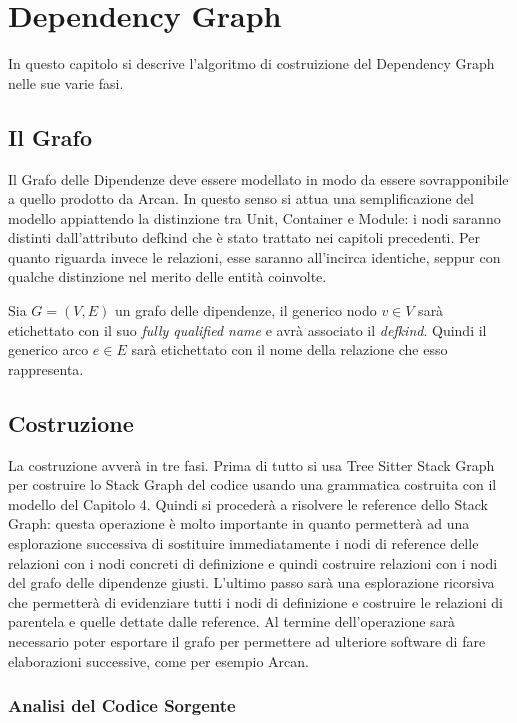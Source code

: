 \chapter{Dependency Graph}

In questo capitolo si descrive l'algoritmo di costruizione del Dependency Graph nelle sue varie fasi.

\section{Il Grafo}

Il Grafo delle Dipendenze deve essere modellato in modo da essere sovrapponibile a quello prodotto da Arcan.
In questo senso si attua una semplificazione del modello appiattendo la distinzione tra Unit, Container e Module: i nodi saranno distinti dall'attributo defkind che \`e stato trattato nei capitoli precedenti.
Per quanto riguarda invece le relazioni, esse saranno all'incirca identiche, seppur con qualche distinzione nel merito delle entit\`a coinvolte.

Sia $G = (V, E)$ un grafo delle dipendenze, il generico nodo $v \in V$ sar\`a etichettato con il suo \emph{fully qualified name} e avr\`a associato il \emph{defkind}.
Quindi il generico arco $e \in E$ sar\`a etichettato con il nome della relazione che esso rappresenta.

\section{Costruzione}

La costruzione avver\`a in tre fasi.
Prima di tutto si usa Tree Sitter Stack Graph per costruire lo Stack Graph del codice usando una grammatica costruita con il modello del Capitolo 4.
Quindi si proceder\`a a risolvere le reference dello Stack Graph: questa operazione \`e molto importante in quanto permetter\`a ad una esplorazione successiva di sostituire immediatamente i nodi di reference delle relazioni con i nodi concreti di definizione e quindi costruire relazioni con i nodi del grafo delle dipendenze giusti.
L'ultimo passo sar\`a una esplorazione ricorsiva che permetter\`a di evidenziare tutti i nodi di definizione e costruire le relazioni di parentela e quelle dettate dalle reference.
Al termine dell'operazione sar\`a necessario poter esportare il grafo per permettere ad ulteriore software di fare elaborazioni successive, come per esempio Arcan.

\subsection{Analisi del Codice Sorgente}

